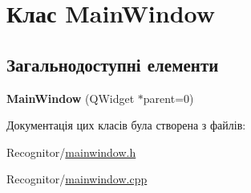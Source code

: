 \hypertarget{classMainWindow}{\section{Клас Main\-Window}
\label{classMainWindow}
}
\subsection*{Загальнодоступні елементи}
\begin{DoxyCompactItemize}
\item 
\hypertarget{classMainWindow_a8b244be8b7b7db1b08de2a2acb9409db}{{\bfseries Main\-Window} (Q\-Widget $\ast$parent=0)}\label{classMainWindow_a8b244be8b7b7db1b08de2a2acb9409db}

\end{DoxyCompactItemize}


Документація цих класів була створена з файлів\-:\begin{DoxyCompactItemize}
\item 
Recognitor/\hyperlink{mainwindow_8h}{mainwindow.\-h}\item 
Recognitor/\hyperlink{mainwindow_8cpp}{mainwindow.\-cpp}\end{DoxyCompactItemize}
